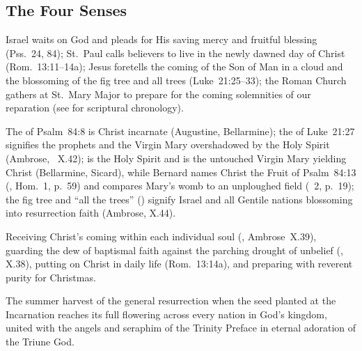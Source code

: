 \subsection{The Four Senses}

\begin{fourSenses}
\item[Literal.] Israel waits on God and pleads for His saving mercy and fruitful blessing (Pss.~24, 84); St.~Paul calls believers to live in the newly dawned day of Christ (Rom.~13:11--14a); Jesus foretells the coming of the Son of Man in a cloud and the blossoming of the fig tree and all trees (Luke~21:25--33); the Roman Church gathers at St.~Mary Major to prepare for the coming solemnities of our reparation (see \hyperref[sec:date-location]{} for scriptural chronology).
\item[Allegorical.] The  of Psalm~84:8 is Christ incarnate (Augustine, Bellarmine); the  of Luke~21:27 signifies the prophets and the Virgin Mary overshadowed by the Holy Spirit (Ambrose, ~X.42);  is the Holy Spirit and  is the untouched Virgin Mary yielding Christ (Bellarmine, Sicard), while Bernard names Christ the Fruit of Psalm~84:13 (, Hom.~1, p.~59) and compares Mary's womb to an unploughed field (~2, p.~19); the fig tree and ``all the trees'' () signify Israel and all Gentile nations blossoming into resurrection faith (Ambrose, X.44).
\item[Moral.] Receiving Christ's coming within each individual soul (, Ambrose~X.39), guarding the dew of baptismal faith against the parching drought of unbelief (, X.38), putting on Christ in daily life (Rom.~13:14a), and preparing with reverent purity for Christmas.
\item[Anagogical.] The summer harvest of the general resurrection when the seed planted at the Incarnation reaches its full flowering across every nation in God's kingdom, united with the angels and seraphim of the Trinity Preface in eternal adoration of the Triune God.
\end{fourSenses}
